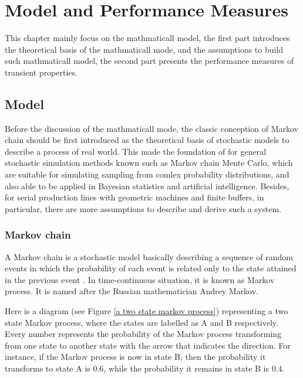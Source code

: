 \chapter{Model and Performance Measures}
\label{B_Kapitel}
\noindent This chapter mainly focus on the mathmaticall model, the first part introduces the theoretical basis of the mathmaticall mode, and the assumptions to build such mathmaticall model, the second part presents the performance measures of transient properties.

\section{Model}
\noindent Before the discussion of the mathmaticall mode, the classic conception of Markov chain should be first introduced as the theoretical basis of stochastic models to describe a process of real world. This made the foundation of for general stochastic simulation methods known such as Markov chain Mente Carlo, which are suitable for simulating sampling from comlex probability distributions, and also able to be applied in Bayesian statistics and artificial intelligence. Besides, for serial production lines with geometric machines and finite buffers, in particular, there are more assumptions to describe and derive such a system.

\subsection{Markov chain}
\noindent A Markov chain is a stochastic model basically describing a sequence of random events in which the probability of each event is related only to the state attained in the previous event \cite{gagniuc2017markov}. In time-continuous situation, it is known as Markov process. It is named after the Russian mathematician Andrey Markov. 

Here is a diagram (see Figure \ref{a two state markov process}) representing a two state Markov process, where the states are labelled as A and B respectively. Every number represents the probability of the Markov process transforming from one state to another state with the arrow that indicates the direction. For instance, if the Markov process is now in state B, then the probability it transforms to state A is 0.6, while the probability it remains in state B is 0.4.

